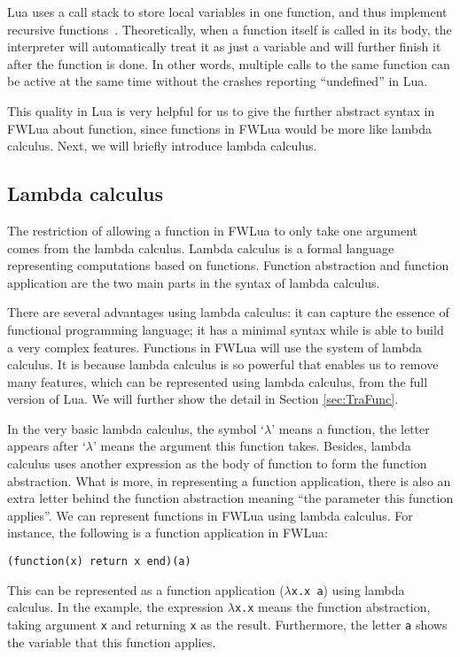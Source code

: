 Lua uses a call stack to store local variables in one function, and thus implement recursive functions~\cite{begLua}. Theoretically, when a function itself is called in its body, the interpreter will automatically treat it as just a variable and will further finish it after the function is done. In other words, multiple calls to the same function can be active at the same time without the crashes reporting ``undefined'' in Lua.

This quality in Lua is very helpful for us to give the further abstract syntax in FWLua about function, since functions in FWLua would be more like lambda calculus. Next, we will briefly introduce lambda calculus.

\subsection{Lambda calculus}
The restriction of allowing a function in FWLua to only take one argument comes from the lambda calculus. Lambda calculus is a formal language representing computations based on functions. Function abstraction and function application are the two main parts in the syntax of lambda calculus. 

There are several advantages using lambda calculus: it can capture the essence of functional programming language; it has a minimal syntax while is able to build a very complex features. Functions in FWLua will use the system of lambda calculus. It is because lambda calculus is so powerful that enables us to remove many features, which can be represented using lambda calculus, from the full version of Lua. We will further show the detail in Section \ref{sec:TraFunc}.

In the very basic lambda calculus, the symbol `$\lambda$' means a function, the letter appears after `$\lambda$' means the argument this function takes.
Besides, lambda calculus uses another expression as the body of function to form the function abstraction. What is more, in representing a function application, there is also an extra letter behind the function abstraction meaning ``the parameter this function applies''. We can represent functions in FWLua using lambda calculus. For instance, the following is a function application in FWLua:

\begin{verbatim}
(function(x) return x end)(a)
\end{verbatim}

This can be represented as a function application ({\tt $\lambda$x.x a}) using lambda calculus. In the example, the expression {\tt $\lambda$x.x} means the function abstraction, taking argument {\tt x} and returning {\tt x} as the result. Furthermore, the letter {\tt a} shows the variable that this function applies.

